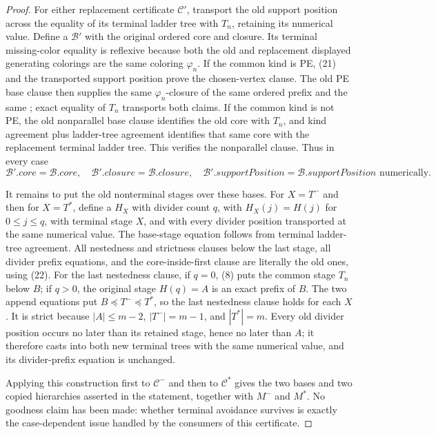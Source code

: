 \begin{proof}
For either replacement certificate \(\mathcal C'\), transport the old
support position across the equality of its terminal ladder tree with
\(T_n\), retaining its numerical value.  Define a
 \(\mathcal B'\) with the original ordered core
and closure.  Its terminal missing-color equality is reflexive because
both the old and replacement displayed generating colorings are the
same coloring \(\varphi_n\).  If the common kind is PE, (21) and the
transported support position prove the chosen-vertex clause.  The old
PE base clause then supplies the same \(\varphi_n\)-closure of the same
ordered prefix and the same
; exact equality of \(T_n\) transports both
claims.  If the common kind is not PE, the old nonparallel base clause
identifies the old core with \(T_n\), and kind agreement plus ladder-tree
agreement identifies that same core with the replacement terminal
ladder tree.  This verifies the nonparallel clause.  Thus in every case
\[
 \mathcal B'.\mathit{core}=\mathcal B.\mathit{core},\quad
 \mathcal B'.\mathit{closure}=\mathcal B.\mathit{closure},\quad
 \mathcal B'.\mathit{supportPosition}
   =\mathcal B.\mathit{supportPosition}\text{ numerically}. \tag{22}
\]

It remains to put the old nonterminal stages over these bases.  For
\(X=T^-\) and then for \(X=T^*\), define a
 \(H_X\) with divider count \(q\), with
\(H_X(j)=H(j)\) for \(0\leq j\leq q\), with terminal stage \(X\), and
with every divider position transported at the same numerical value.
The base-stage equation follows from terminal ladder-tree agreement.
All nestedness and strictness clauses below the last stage, all divider
prefix equations, and the core-inside-first clause are literally the old
ones, using (22).  For the last nestedness clause, if \(q=0\), (8) puts
the common stage \(T_n\) below \(B\); if \(q>0\), the original stage
\(H(q)=A\) is an exact prefix of \(B\).  The two append equations put
\(B\preccurlyeq T^-\preccurlyeq T^*\), so the last nestedness clause
holds for each \(X\).  It is strict because \(|A|\leq m-2\),
\(|T^-|=m-1\), and \(|T^*|=m\).  Every old divider position occurs no
later than its retained stage, hence no later than \(A\); it therefore
casts into both new terminal trees with the same numerical value, and
its divider-prefix equation is unchanged.

Applying this construction first to \(\mathcal C^-\) and then to
\(\mathcal C^*\) gives the two bases and two copied hierarchies asserted
in the statement, together with \(M^-\) and \(M^*\).  No goodness claim
has been made: whether terminal avoidance survives is exactly the
case-dependent issue handled by the consumers of this certificate.
\end{proof}
